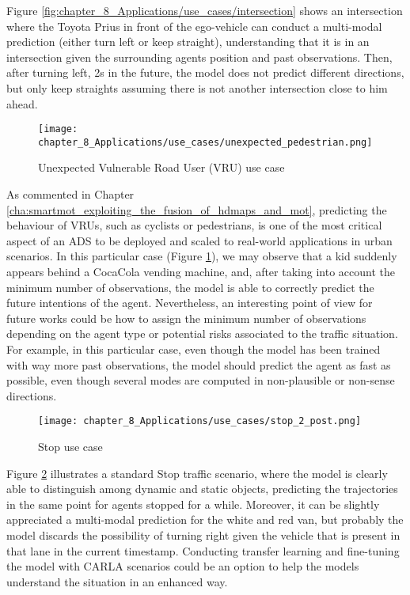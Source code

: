 Figure \ref{fig:chapter_8_Applications/use_cases/intersection} shows an intersection where the Toyota Prius in front of the ego-vehicle can conduct a multi-modal prediction (either turn left or keep straight), understanding that it is in an intersection given the surrounding agents position and past observations. Then, after turning left, 2s in the future, the model does not predict different directions, but only keep straights assuming there is not another intersection close to him ahead.

\begin{figure}[!h]
	\centering
	\texttt{[image: chapter\_8\_Applications/use\_cases/unexpected\_pedestrian.png]}
	\caption{Unexpected Vulnerable Road User (VRU) use case}
	\label{fig:chapter_8_Applications/use_cases/unexpected_pedestrian}
\end{figure}

As commented in Chapter \ref{cha:smartmot_exploiting_the_fusion_of_hdmaps_and_mot}, predicting the behaviour of \acp{VRU}, such as cyclists or pedestrians, is one of the most critical aspect of an \ac{ADS} to be deployed and scaled to real-world applications in urban scenarios. In this particular case (Figure \ref{fig:chapter_8_Applications/use_cases/unexpected_pedestrian}), we may observe that a kid suddenly appears behind a CocaCola vending machine, and, after taking into account the minimum number of observations, the model is able to correctly predict the future intentions of the agent. Nevertheless, an interesting point of view for future works could be how to assign the minimum number of observations depending on the agent type or potential risks associated to the traffic situation. For example, in this particular case, even though the model has been trained with way more past observations, the model should predict the agent as fast as possible, even though several modes are computed in non-plausible or non-sense directions.

\begin{figure}[!h]
	\centering
	\texttt{[image: chapter\_8\_Applications/use\_cases/stop\_2\_post.png]}
	\caption{Stop use case}
	\label{fig:chapter_8_Applications/use_cases/stop}
\end{figure}

Figure \ref{fig:chapter_8_Applications/use_cases/stop} illustrates a standard Stop traffic scenario, where the model is clearly able to distinguish among dynamic and static objects, predicting the trajectories in the same point for agents stopped for a while. Moreover, it can be slightly appreciated a multi-modal prediction for the white and red van, but probably the model discards the possibility of turning right given the vehicle that is present in that lane in the current timestamp. Conducting transfer learning and fine-tuning the model with \ac{CARLA} scenarios could be an option to help the models understand the situation in an enhanced way.  

